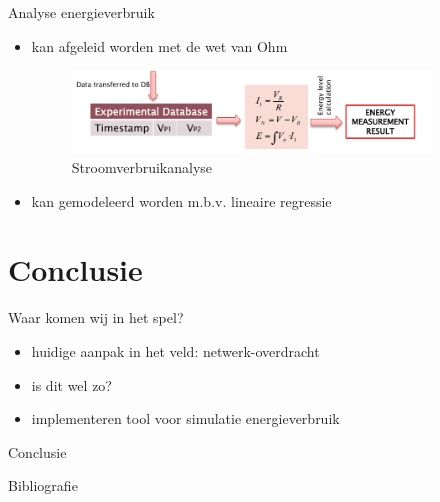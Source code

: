 \documentclass[presentation, bigger]{beamer}
\begin{document}
\begin{frame}[label=sec-3-5]{Analyse energieverbruik}
\begin{itemize}
\item kan afgeleid worden met de wet van Ohm
  \begin{figure}
    \centering
    \includegraphics[width=0.9\textwidth,keepaspectration=true]{elek/diag2}

    \caption{Stroomverbruikanalyse}
  \end{figure}
\item kan gemodeleerd worden m.b.v. lineaire regressie
\end{itemize}
\end{frame}
\section{Conclusie}
\label{sec-4}
\begin{frame}[label=sec-4-1]{Waar komen wij in het spel?}
\begin{itemize}
\item huidige aanpak in het veld: netwerk-overdracht
\item is dit wel zo?
\item implementeren tool voor simulatie energieverbruik
\end{itemize}
\end{frame}

\begin{frame}[label=sec-4-2]{Conclusie}
\end{frame}
\begin{frame}[allowframebreaks]{Bibliografie}
\nocite{*}
\printbibliography
\end{frame}

\end{document}
